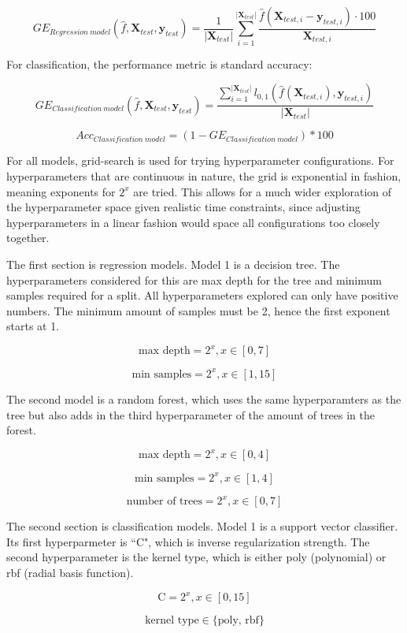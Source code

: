 \documentclass[12pt, letterpaper]{article}
\begin{document}
$$
    GE_{Regression\ model}(\hat{f}, \bm{X}_{test}, \bm{y}_{test}) = \frac{1}{|\bm{X}_{test}|} \sum_{i=1}^{|\bm{X}_{test}|} \frac{\hat{f}(\bm{X}_{test,i} - \bm{y}_{test,i}) \cdot 100}{\bm{X}_{test,i}}
$$

For classification, the performance metric is standard accuracy:

$$
    GE_{Classification\ model}(\hat{f}, \bm{X}_{test}, \bm{y}_{test}) = \frac{\sum_{i=1}^{|\bm{X}_{test}|}l_{0,1}(\hat{f}(\bm{X}_{test,i}), \bm{y}_{test,i})}{|\bm{X}_{test}|}
$$

$$
Acc_{Classification\ model} = (1 - GE_{Classification\ model}) * 100
$$

For all models, grid-search is used for trying hyperparameter configurations. For hyperparameters that are continuous in nature, the grid is exponential in fashion, meaning exponents for $2^x$ are tried. This allows for a much wider exploration of the hyperparameter space given realistic time constraints, since adjusting hyperparameters in a linear fashion would space all configurations too closely together.

The first section is regression models. Model 1 is a decision tree. The hyperparameters considered for this are max depth for the tree and minimum samples required for a split. All hyperparameters explored can only have positive numbers. The minimum amount of samples must be 2, hence the first exponent starts at 1.

$$
\text{max depth} = 2^x, x \in [0,7]
$$

$$
\text{min samples} = 2^x, x \in [1,15]
$$

The second model is a random forest, which uses the same hyperparamters as the tree but also adds in the third hyperparameter of the amount of trees in the forest.

$$
\text{max depth} = 2^x, x \in [0,4]
$$

$$
\text{min samples} = 2^x, x \in [1,4]
$$

$$
\text{number of trees} = 2^x, x \in [0,7]
$$

The second section is classification models. Model 1 is a support vector classifier. Its first hyperparmeter is ``C", which is inverse regularization strength. The second hyperparameter is the kernel type, which is either poly (polynomial) or rbf (radial basis function).

$$
\text{C} = 2^x, x \in [0,15]
$$

$$
\text{kernel type} \in \{\text{poly, rbf}\}
$$
\end{document}
